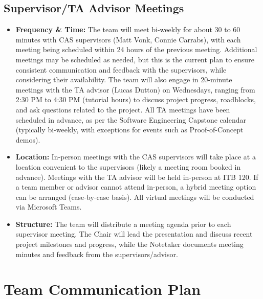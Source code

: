 \documentclass{article}
\begin{document}
\subsection{Supervisor/TA Advisor Meetings}
\begin{itemize}
    \item \textbf{Frequency \& Time:} The team will meet bi-weekly for about 30 to 60 minutes with CAS supervisors 
    (Matt Vonk, Connie Carrabs), with each meeting being scheduled within 24 hours of the previous meeting. 
    Additional meetings may be scheduled as needed, but this is the current plan to ensure consistent communication 
    and feedback with the supervisors, while considering their availability. The team will also engage in 20-minute 
    meetings with the TA advisor (Lucas Dutton) on Wednesdays, ranging from 2:30 PM to 4:30 PM (tutorial hours) to 
    discuss project progress, roadblocks, and ask questions related to the project. All TA meetings have been scheduled 
    in advance, as per the Software Engineering Capstone calendar (typically bi-weekly, with exceptions for events such as Proof-of-Concept demos).
    \item \textbf{Location:} In-person meetings with the CAS supervisors will take place at a location convenient to the supervisors (likely a meeting room booked in advance). 
    Meetings with the TA advisor will be held in-person at ITB 120. If a team member or advisor cannot attend in-person, 
    a hybrid meeting option can be arranged (case-by-case basis). All virtual meetings will be conducted via Microsoft Teams.
    \item \textbf{Structure:} The team will distribute a meeting agenda prior to each supervisor meeting. The Chair will 
    lead the presentation and discuss recent project milestones and progress, while the Notetaker documents meeting minutes and feedback from the supervisors/advisor.
\end{itemize}

\section{Team Communication Plan}

\end{document}

